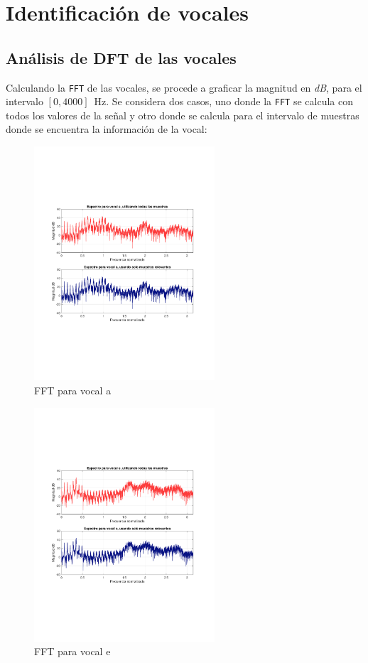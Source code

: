 \section{Identificación de vocales}
	\subsection{Análisis de DFT de las vocales}
	Calculando la \texttt{FFT} de las vocales, se procede a graficar la magnitud en \textit{dB}, para el intervalo $\left[ 0, 4000 \right]$~Hz. Se considera dos casos, uno donde la \texttt{FFT} se calcula con todos los valores de la señal y otro donde se calcula para el intervalo de muestras donde se encuentra la información de la vocal: 
	\begin{figure}[H]
		\center
		\includegraphics[width=0.6\textwidth,clip, trim = {1.9cm 6.8cm 2.3cm 7cm}]{../plots/a_fft.pdf}
		\caption{FFT para vocal a}
		\label{fig:a_fft}
	\end{figure}
	
	\begin{figure}[H]
		\center
		\includegraphics[width=0.6\textwidth,clip, trim = {1.9cm 6.8cm 2.3cm 7cm}]{../plots/e_fft.pdf}
		\caption{FFT para vocal e}
		\label{fig:e_fft}
	\end{figure}
	
